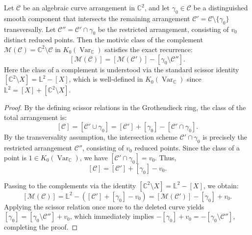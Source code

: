 \documentclass[article,11pt]{amsart} \numberwithin{equation}{section}
\numberwithin{equation}{section}
\begin{document}
{\begin{thm}
	\label{thm:motivic_dr}
	Let $\mathcal C$ be an algebraic curve arrangement in $\mathbb{C}^2$,
	and let $\gamma_0 \in \mathcal C$ be a distinguished smooth component 
	that intersects the remaining arrangement $\mathcal C' = \mathcal C \setminus \{\gamma_0\}$ 
	transversally. Let $\mathcal C'' = \mathcal C' \cap \gamma_0$
	be the restricted arrangement, consisting of $v_0$ distinct reduced points.
	Then the motivic class of the complement
	$\mathcal{M}(\mathcal C) = \mathbb{C}^2 \setminus \mathcal C$ in
	$K_0(\operatorname{Var}_{\mathbb{C}})$ satisfies the exact recurrence:
	\[
	[\mathcal{M}(\mathcal C)] = [\mathcal{M}(\mathcal C')] - [\gamma_0 \setminus \mathcal C''].
	\]
	Here the class of a complement is understood via the standard scissor
	identity $[\mathbb{C}^2 \setminus X] = \mathbb{L}^2 - [X]$, which is
	well-defined in $K_0(\operatorname{Var}_{\mathbb{C}})$ since
	$\mathbb{L}^2 = [X] + [\mathbb{C}^2 \setminus X]$.
\end{thm}

\begin{proof}
	By the defining scissor relations in the Grothendieck ring, the class
	of the total arrangement is:
	\[
	[\mathcal C] = [\mathcal C' \cup \gamma_0] = [\mathcal C'] + [\gamma_0] - [\mathcal C' \cap \gamma_0].
	\]
	By the transversality assumption, the intersection scheme
	$\mathcal C' \cap \gamma_0$ is precisely the restricted arrangement
	$\mathcal C''$, consisting of $v_0$ reduced points. Since the class of
	a point is $1 \in K_0(\operatorname{Var}_{\mathbb{C}})$, we have
	$[\mathcal C' \cap \gamma_0] = v_0$. Thus,
	\[
	[\mathcal C] = [\mathcal C'] + [\gamma_0] - v_0.
	\]
	
	Passing to the complements via the identity
	$[\mathbb{C}^2 \setminus X] = \mathbb{L}^2 - [X]$, we obtain:
	\[
	[\mathcal{M}(\mathcal C)] = \mathbb{L}^2 - ([\mathcal C'] + [\gamma_0] - v_0)
	= [\mathcal{M}(\mathcal C')] - [\gamma_0] + v_0.
	\]
	Applying the scissor relation once more to the deleted curve yields
	$[\gamma_0] = [\gamma_0 \setminus \mathcal C''] + v_0$, which immediately
	implies $-[\gamma_0] + v_0 = -[\gamma_0 \setminus \mathcal C'']$,
	completing the proof.
\end{proof}

}
\end{document}
